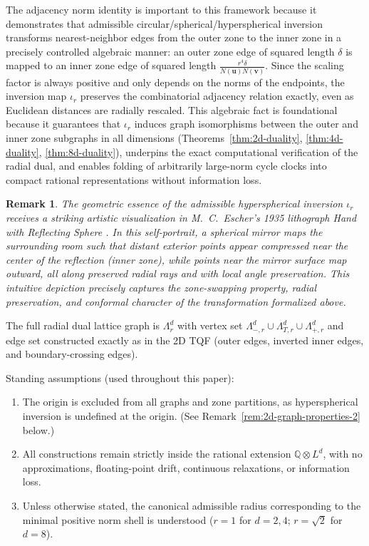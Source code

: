 \documentclass{article}
\newtheorem{remark}{Remark}
\begin{document}
The adjacency norm identity is important to this framework because it demonstrates that admissible circular/spherical/hyperspherical inversion transforms nearest-neighbor edges from the outer zone to the inner zone in a precisely controlled algebraic manner: an outer zone edge of squared length \(\delta\) is mapped to an inner zone edge of squared length \(\frac{r^4 \delta}{N(\mathbf{u})N(\mathbf{v})}\). Since the scaling factor is always positive and only depends on the norms of the endpoints, the inversion map \(\iota_r\) preserves the combinatorial adjacency relation exactly, even as Euclidean distances are radially rescaled. This algebraic fact is foundational because it guarantees that \(\iota_r\) induces graph isomorphisms between the outer and inner zone subgraphs in all dimensions (Theorems~\ref{thm:2d-duality}, \ref{thm:4d-duality}, \ref{thm:8d-duality}), underpins the exact computational verification of the radial dual, and enables folding of arbitrarily large-norm cycle clocks into compact rational representations without information loss.

\begin{remark}
\label{rem:escher-visualization}
The geometric essence of the admissible hyperspherical inversion $\iota_r$ receives a striking artistic visualization in M.~C.~Escher's 1935 lithograph \emph{Hand with Reflecting Sphere} \cite{Escher1935}. In this self-portrait, a spherical mirror maps the surrounding room such that distant exterior points appear compressed near the center of the reflection (inner zone), while points near the mirror surface map outward, all along preserved radial rays and with local angle preservation. This intuitive depiction precisely captures the zone-swapping property, radial preservation, and conformal character of the transformation formalized above.
\end{remark}

The full radial dual lattice graph is $\Lambda_r^d$ with vertex set $\Lambda_{-,r}^d \cup \Lambda_{T,r}^d \cup \Lambda_{+,r}^d$ and edge set constructed exactly as in the 2D TQF (outer edges, inverted inner edges, and boundary-crossing edges).

Standing assumptions (used throughout this paper):
\begin{enumerate}
  \item The origin is excluded from all graphs and zone partitions, as hyperspherical inversion is undefined at the origin. (See Remark~\ref{rem:2d-graph-properties-2} below.)
  \item All constructions remain strictly inside the rational extension $\mathbb{Q} \otimes L^d$, with no approximations, floating-point drift, continuous relaxations, or information loss.
  \item Unless otherwise stated, the canonical admissible radius corresponding to the minimal positive norm shell is understood ($r=1$ for $d=2,4$; $r=\sqrt{2}$ for $d=8$).
\end{enumerate}
\end{document}
